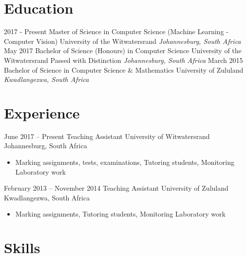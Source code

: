 \documentclass[letterpaper]{moderncv}        %
\begin{document}
\makecvtitle
\section{Education}
\cventry
{2017 - Present}
{Master of Science in Computer Science (Machine Learning - Computer Vision)}
{University of the Witwatersrand}
{}
{\textit{Johannesburg, South Africa}}
{}
\cventry
{May 2017}
{Bachelor of Science (Honours) in Computer Science}
{University of the Witwatersrand}
{Passed with Distinction}
{\textit{Johannesburg, South Africa}}
{}
\cventry
{March 2015}
{Bachelor of Science in Computer Science \& Mathematics}
{University of Zululand}
{}
{\textit{Kwadlangezwa, South Africa}}
{}
\section{Experience}
\cventry
{June 2017 -- Present}
{Teaching Assistant}
{University of Witwatersrand}
{Johannesburg, South Africa}
{}
{\begin{itemize}%
	\item Marking assignments, tests, examinations, Tutoring students, Monitoring Laboratory work
	\end{itemize}}
\cventry
{February 2013 -- November 2014}
{Teaching Assistant}
{University of Zululand}
{Kwadlangezwa, South Africa}
{}
{\begin{itemize}%
	\item Marking assignments, Tutoring students, Monitoring Laboratory work
	\end{itemize}}
\section{Skills}
\end{document}
